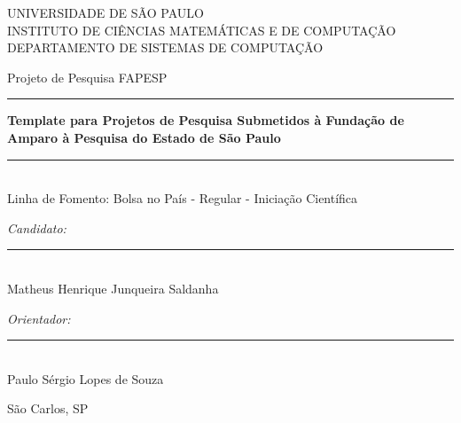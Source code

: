 \documentclass[12pt,a4paper]{article}
\begin{document}
\doublespacing

\begin{titlepage}
    \begin{center}
        {\large \sc UNIVERSIDADE DE SÃO PAULO} \\
        {\large \sc INSTITUTO DE CIÊNCIAS MATEMÁTICAS E DE COMPUTAÇÃO}\\[0.7cm]
        {\small \sc DEPARTAMENTO DE SISTEMAS DE COMPUTAÇÃO}
        
        \vspace{4cm}

        {\large \sc Projeto de Pesquisa FAPESP}\\
        \rule{\linewidth}{2pt}
        
        \vspace{0.7em} %
        {\Large \bfseries Template para Projetos de Pesquisa Submetidos à Fundação de Amparo à Pesquisa do Estado de São Paulo}
        \vspace{0.2em} %
        
        \rule{\linewidth}{2pt} \\
        {\small \sc Linha de Fomento: Bolsa no País - Regular - Iniciação Científica}
    \end{center}
    
    \vspace{2.8cm}

    \begin{minipage}{0.43\textwidth}
        \emph{Candidato:}\\[2.08cm]
        \rule{0.9\linewidth}{0.3mm}\\
        Matheus Henrique Junqueira Saldanha
    \end{minipage}
    \hspace{1cm}
    \begin{minipage}{0.43\textwidth}
        \emph{Orientador:}\\[2.08cm]
        \rule{0.9\linewidth}{0.3mm}\\
        Paulo Sérgio Lopes de Souza
    \end{minipage}

    \vfill

    \begin{center}
        \makeatletter
        São Carlos, SP \\
        \@date
        \makeatother
    \end{center}
\end{titlepage}
\end{document}

